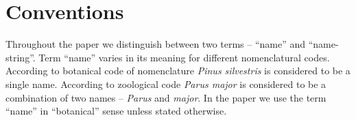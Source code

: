 \documentclass{bmcart}
\begin{document}
\begin{frontmatter}
\begin{abstractbox}

\begin{keyword}
\end{keyword}


\end{abstractbox}
%

\end{frontmatter}



\section*{Conventions}

Throughout the paper we distinguish between two terms -- ``name'' and
``name-string''. Term ``name'' varies in its meaning for different
nomenclatural codes. According to botanical code of nomenclature \cite{ICN}
\textit{Pinus silvestris} is considered to be a single name. According to
zoological code \cite{ICZN} \textit{Parus major} is considered to be a
combination of two names -- \textit{Parus} and \textit{major}. In the paper we
use the term ``name'' in ``botanical'' sense unless stated otherwise.
\end{document}
